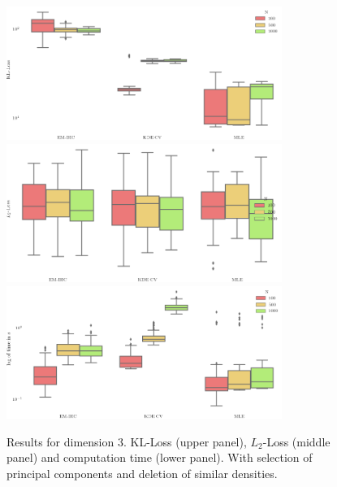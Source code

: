 \begin{figure}
\center
    \includegraphics[width=0.8\textwidth]{./TeX_files/dict_gen_loss_dim_3_KL_gof_pc_select.png}
    \includegraphics[width=0.8\textwidth]{./TeX_files/dict_gen_loss_dim_3_L2_gof_pc_select.png}
    \includegraphics[width=0.8\textwidth]{./TeX_files/dict_gen_time_dim_3_gof_pc_select.png}
    \caption{Results for dimension 3. KL-Loss (upper panel), $L_2$-Loss (middle panel) and computation time (lower panel). With selection of principal components and deletion of similar densities.}
    \label{fig:result_dict_gen_dim_3_gof_pc_select}
\end{figure}
